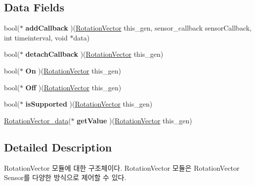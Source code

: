 \subsection*{Data Fields}
\begin{DoxyCompactItemize}
\item 
\hypertarget{struct__RotationVector_ab9da37e33614d4a4279ec7de4c53ec92}{bool($\ast$ {\bfseries add\-Callback} )(\hyperlink{struct__RotationVector}{Rotation\-Vector} this\-\_\-gen, sensor\-\_\-callback sensor\-Callback, int timeinterval, void $\ast$data)}\label{struct__RotationVector_ab9da37e33614d4a4279ec7de4c53ec92}

\item 
\hypertarget{struct__RotationVector_af5fb1156bf881309994b5134beb8b62c}{bool($\ast$ {\bfseries detach\-Callback} )(\hyperlink{struct__RotationVector}{Rotation\-Vector} this\-\_\-gen)}\label{struct__RotationVector_af5fb1156bf881309994b5134beb8b62c}

\item 
\hypertarget{struct__RotationVector_a961f05d2518f2ad336d07ed337363b47}{bool($\ast$ {\bfseries On} )(\hyperlink{struct__RotationVector}{Rotation\-Vector} this\-\_\-gen)}\label{struct__RotationVector_a961f05d2518f2ad336d07ed337363b47}

\item 
\hypertarget{struct__RotationVector_aaba2298a89218a4a86a7619e476936ee}{bool($\ast$ {\bfseries Off} )(\hyperlink{struct__RotationVector}{Rotation\-Vector} this\-\_\-gen)}\label{struct__RotationVector_aaba2298a89218a4a86a7619e476936ee}

\item 
\hypertarget{struct__RotationVector_a6064cf9c8ed8eeb39afea3993119d471}{bool($\ast$ {\bfseries is\-Supported} )(\hyperlink{struct__RotationVector}{Rotation\-Vector} this\-\_\-gen)}\label{struct__RotationVector_a6064cf9c8ed8eeb39afea3993119d471}

\item 
\hypertarget{struct__RotationVector_ac37bd4354c04172e326f5c6f86580785}{\hyperlink{Sensor_8h_d9/d01/struct__4d__data}{Rotation\-Vector\-\_\-data}($\ast$ {\bfseries get\-Value} )(\hyperlink{struct__RotationVector}{Rotation\-Vector} this\-\_\-gen)}\label{struct__RotationVector_ac37bd4354c04172e326f5c6f86580785}

\end{DoxyCompactItemize}


\subsection{Detailed Description}
Rotation\-Vector 모듈에 대한 구조체이다. Rotation\-Vector 모듈은 Rotation\-Vector Sensor를 다양한 방식으로 제어할 수 있다. 

